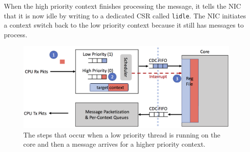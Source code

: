 When the high priority context finishes processing the message, it tells the NIC that it is now idle by writing to a dedicated CSR called \texttt{lidle}. The NIC initiates a context switch back to the low priority context because it still has messages to process.

\begin{figure}
  \includegraphics[width=\linewidth]{./figures/nic-scheduler}
  \caption{The steps that occur when a low priority thread is running on the core and then a message arrives for a higher priority context.}
  \label{fig:nic-scheduler}
\end{figure}
